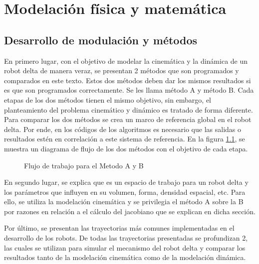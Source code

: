 \chapter{Modelación física y matemática}\label{CAP4}
    
\section{Desarrollo de modulación y métodos}
    En primero lugar, con el objetivo de modelar la cinemática y la dinámica de un robot delta de manera veraz, se presentan 2 métodos que son programados y comparados en este texto. Estos dos métodos deben dar los mismos resultados si es que son programados correctamente. Se les llama método A y método B. Cada etapas de los dos métodos tienen el mismo objetivo, sin embargo, el planteamiento del problema cinemático y dinámico es tratado de forma diferente. Para comparar los dos métodos se crea un marco de referencia global en el robot delta. Por ende, en los códigos de los algoritmos es necesario que las salidas o resultados estén en correlación a este sistema de referencia. En la figura \ref{f:Cap4_metodologia}, se muestra un diagrama de flujo de los dos métodos con el objetivo de cada etapa.
    
    
\begin{figure}[htb]
    \centering
    \caption{Flujo de trabajo para el Metodo A y B}
    \label{f:Cap4_metodologia}
\end{figure}

    En segundo lugar, se explica que es un espacio de trabajo para un robot delta y los parámetros que influyen en su volumen, forma, densidad espacial, etc. Para ello, se utiliza la modelación cinemática y se privilegia el método A sobre la B por razones en relación a el cálculo del jacobiano que se explican en dicha sección.
    
    Por último, se presentan las trayectorias más comunes implementadas en el desarrollo de los robots. De todas las trayectorias presentadas se profundizan 2, las cuales se utilizan para simular el mecanismo del robot delta y comparar los resultados tanto de la modelación cinemática como de la modelación dinámica.
    
